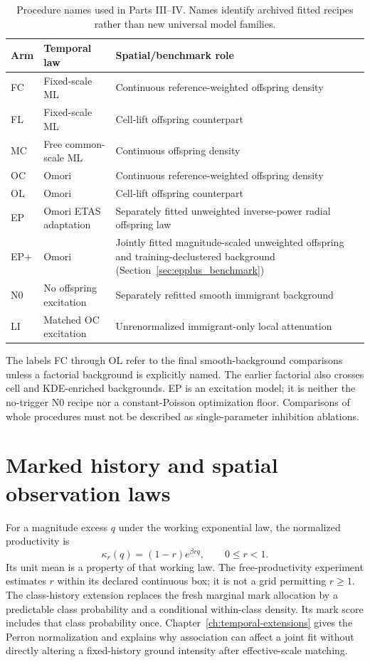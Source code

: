 \begin{table}[htbp]\centering\small
\caption{Procedure names used in Parts III--IV. Names identify archived fitted recipes rather than new universal model families.}\label{tab:arm-dictionary}
\begin{tabularx}{\textwidth}{@{}lXX@{}}
\toprule Arm & Temporal law & Spatial/benchmark role \\\midrule
FC & Fixed-scale ML & Continuous reference-weighted offspring density \\
FL & Fixed-scale ML & Cell-lift offspring counterpart \\
MC & Free common-scale ML & Continuous offspring density \\
OC & Omori & Continuous reference-weighted offspring density \\
OL & Omori & Cell-lift offspring counterpart \\
EP & Omori ETAS adaptation & Separately fitted unweighted inverse-power radial offspring law \\
EP+ & Omori & Jointly fitted magnitude-scaled unweighted offspring and training-declustered background (Section~\ref{sec:epplus_benchmark}) \\
N0 & No offspring excitation & Separately refitted smooth immigrant background \\
LI & Matched OC excitation & Unrenormalized immigrant-only local attenuation \\
\bottomrule\end{tabularx}\end{table}

The labels FC through OL refer to the final smooth-background comparisons unless a factorial background is explicitly named. The earlier factorial also crosses cell and KDE-enriched backgrounds. EP is an excitation model; it is neither the no-trigger N0 recipe nor a constant-Poisson optimization floor. Comparisons of whole procedures must not be described as single-parameter inhibition ablations.

\section{Marked history and spatial observation laws}

For a magnitude excess $q$ under the working exponential law, the normalized productivity is
\[
 \kappa_r(q)=(1-r)e^{\beta rq},\qquad 0\leq r<1.
\]
Its unit mean is a property of that working law. The free-productivity experiment estimates $r$ within its declared continuous box; it is not a grid permitting $r\geq1$. The class-history extension replaces the fresh marginal mark allocation by a predictable class probability and a conditional within-class density. Its mark score includes that class probability once. Chapter~\ref{ch:temporal-extensions} gives the Perron normalization and explains why association can affect a joint fit without directly altering a fixed-history ground intensity after effective-scale matching.

